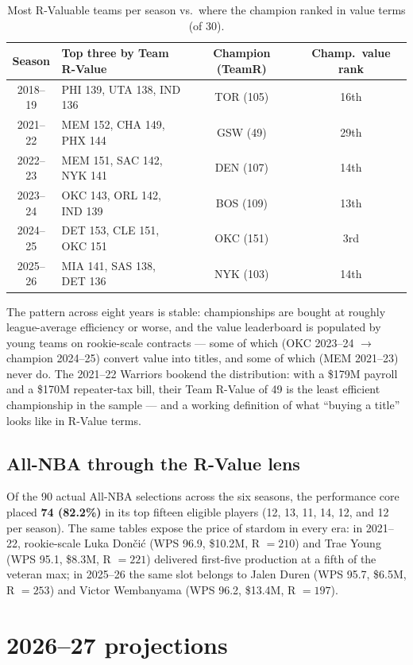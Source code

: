 \documentclass[11pt]{article}
\begin{document}
\begin{table}[h]\centering
\caption{Most R-Valuable teams per season vs.\ where the champion ranked in
value terms (of 30).}
\small
\begin{tabular}{clcc}
\toprule
Season & Top three by Team R-Value & Champion (TeamR) & Champ.\ value rank \\
\midrule
2018--19 & PHI 139, UTA 138, IND 136 & TOR (105) & 16th \\
2021--22 & MEM 152, CHA 149, PHX 144 & GSW (49)  & 29th \\
2022--23 & MEM 151, SAC 142, NYK 141 & DEN (107) & 14th \\
2023--24 & OKC 143, ORL 142, IND 139 & BOS (109) & 13th \\
2024--25 & DET 153, CLE 151, OKC 151 & OKC (151) & 3rd  \\
2025--26 & MIA 141, SAS 138, DET 136 & NYK (103) & 14th \\
\bottomrule
\end{tabular}
\end{table}

The pattern across eight years is stable: championships are bought at roughly
league-average efficiency or worse, and the value leaderboard is populated by
young teams on rookie-scale contracts --- some of which (OKC 2023--24
$\rightarrow$ champion 2024--25) convert value into titles, and some of which
(MEM 2021--23) never do. The 2021--22 Warriors bookend the distribution: with
a \$179M payroll and a \$170M repeater-tax bill, their Team R-Value of 49 is
the least efficient championship in the sample --- and a working definition of
what ``buying a title'' looks like in R-Value terms.

\subsection{All-NBA through the R-Value lens}
Of the 90 actual All-NBA selections across the six seasons, the performance
core placed \textbf{74 (82.2\%)} in its top fifteen eligible players
(12, 13, 11, 14, 12, and 12 per season). The same tables expose the price of
stardom in every era: in 2021--22, rookie-scale Luka Don\v{c}i\'c (WPS 96.9,
\$10.2M, R $= 210$) and Trae Young (WPS 95.1, \$8.3M, R $= 221$) delivered
first-five production at a fifth of the veteran max; in 2025--26 the same slot
belongs to Jalen Duren (WPS 95.7, \$6.5M, R $= 253$) and Victor Wembanyama
(WPS 96.2, \$13.4M, R $= 197$).

\section{2026--27 projections}
\label{sec:predict}
\end{document}
